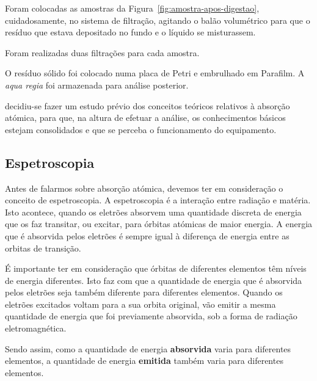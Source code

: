 Foram colocadas as amostras da Figura~\ref{fig:amostra-apos-digestao}, cuidadosamente, no sistema de filtração, agitando o balão volumétrico para que o resíduo que estava depositado no fundo e o líquido se misturassem.

Foram realizadas duas filtrações para cada amostra.

O resíduo sólido foi colocado numa placa de Petri e embrulhado em Parafilm.
A \emph{aqua regia} foi armazenada para análise posterior.


 decidiu-se fazer um estudo prévio dos conceitos teóricos relativos à absorção atómica, para que, na altura de efetuar a análise, os conhecimentos básicos estejam consolidados e que se perceba o funcionamento do equipamento.

\subsection*{Espetroscopia}\label{subsec:espetroscopia}

Antes de falarmos sobre absorção atómica, devemos ter em consideração o conceito de espetroscopia.
A espetroscopia é a interação entre radiação e matéria.
Isto acontece, quando os eletrões absorvem uma quantidade discreta de energia que os faz transitar, ou excitar, para órbitas atómicas de maior energia.
A energia que é absorvida pelos eletrões é sempre igual à diferença de energia entre as orbitas de transição.

É importante ter em consideração que órbitas de diferentes elementos têm níveis de energia diferentes.
Isto faz com que a quantidade de energia que é absorvida pelos eletrões seja também diferente para diferentes elementos.
Quando os eletrões excitados voltam para a sua orbita original, vão emitir a mesma quantidade de energia que foi previamente absorvida, sob a forma de radiação eletromagnética.

Sendo assim, como a quantidade de energia \textbf{absorvida} varia para diferentes elementos, a quantidade de energia \textbf{emitida} também varia para diferentes elementos.

